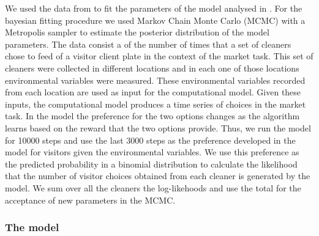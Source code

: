 \documentclass[]{rsos}%
\begin{document}
We used the data from \citep{triki_Biological_2019} to fit the parameters of
the model analysed in \citep{quinones_Reinforcement_2019}. For the bayesian
fitting procedure we used Markov Chain Monte Carlo (MCMC) with a
Metropolis sampler to estimate the posterior distribution of the model
parameters. The data consist a of the number of times that a set of
cleaners chose to feed of a visitor client plate in the context of the
market task. This set of cleaners were collected in different locations
and in each one of those locations environmental variables were
measured. These environmental variables recorded from each location are
used as input for the computational model. Given these inputs, the
computational model produces a time series of choices in the market
task. In the model the preference for the two options changes as the
algorithm learns based on the reward that the two options provide. Thus,
we run the model for 10000 steps and use the last 3000 steps as the
preference developed in the model for visitors given the environmental
variables. We use this preference as the predicted probability in a
binomial distribution to calculate the likelihood that the number of
visitor choices obtained from each cleaner is generated by the model. We
sum over all the cleaners the log-likehoods and use the total for the
acceptance of new parameters in the MCMC.

\hypertarget{the-model}{%
\subsubsection{The model}\label{the-model}}
\end{document}
